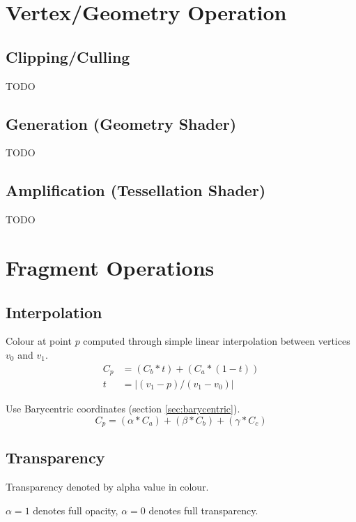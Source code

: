 \documentclass[a4paper]{article}
\begin{document}
\section{Vertex/Geometry Operation}

\subsection{Clipping/Culling}

TODO

\subsection{Generation (Geometry Shader)}

TODO

\subsection{Amplification (Tessellation Shader)}

TODO

\section{Fragment Operations}
\label{sec:fragment_operations}

\subsection{Interpolation}


Colour at point $p$ computed through simple linear interpolation between
vertices $v_{0}$ and $v_{1}$.
\begin{align*}
  C_{p} &= (C_{b} * t) + (C_{a} * (1 - t)) \\
  t &= |(v_{1} - p) / (v_{1} - v_{0})|
\end{align*}


Use Barycentric coordinates (section \ref{sec:barycentric}).
\[
  C_{p} = (\alpha * C_{a}) + (\beta * C_{b}) + (\gamma * C_{c})
\]

\subsection{Transparency}

Transparency denoted by alpha value in colour.

$\alpha = 1$ denotes full opacity, $\alpha = 0$ denotes full transparency.
\end{document}
